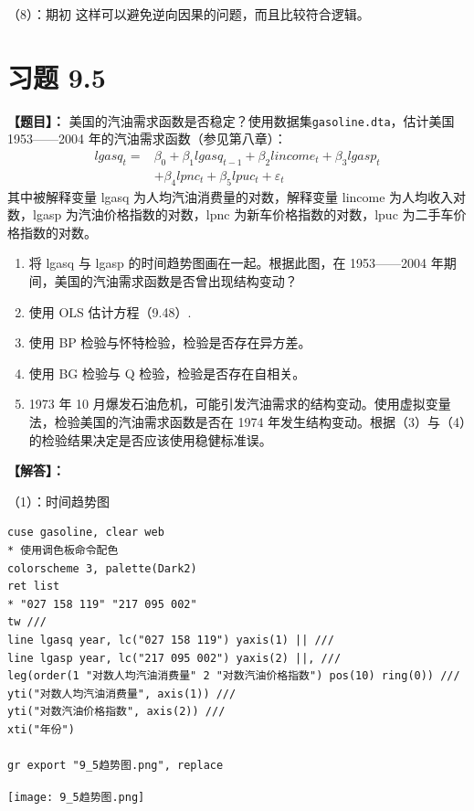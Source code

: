 \documentclass[cn,fancy,blue,11pt]{elegantbook}
\begin{document}
（8）：期初
这样可以避免逆向因果的问题，而且比较符合逻辑。

\hypertarget{section-49}{%
\section{习题 9.5}\label{section-49}}

\textbf{【题目】：}
美国的汽油需求函数是否稳定？使用数据集\lstinline{gasoline.dta}，估计美国 1953------2004 年的汽油需求函数（参见第八章）：
\begin{align}
lgasq_t =& \beta_0 + \beta_1 lgasq_{t-1} + \beta_2lincome_t + \beta_3lgasp_t \\
& + \beta_4lpnc_t + \beta_5lpuc_t + \varepsilon_t
\end{align}
其中被解释变量 lgasq 为人均汽油消费量的对数，解释变量 lincome 为人均收入对数，lgasp 为汽油价格指数的对数，lpnc 为新车价格指数的对数，lpuc 为二手车价格指数的对数。

\begin{enumerate}
\item
  将 lgasq 与 lgasp 的时间趋势图画在一起。根据此图，在 1953------2004 年期间，美国的汽油需求函数是否曾出现结构变动？
\item
  使用 OLS 估计方程（9.48）.
\item
  使用 BP 检验与怀特检验，检验是否存在异方差。
\item
  使用 BG 检验与 Q 检验，检验是否存在自相关。
\item
  1973 年 10 月爆发石油危机，可能引发汽油需求的结构变动。使用虚拟变量法，检验美国的汽油需求函数是否在 1974 年发生结构变动。根据（3）与（4）的检验结果决定是否应该使用稳健标准误。
\end{enumerate}

\textbf{【解答】：}

（1）：时间趋势图

\begin{lstlisting}
cuse gasoline, clear web
* 使用调色板命令配色
colorscheme 3, palette(Dark2)
ret list
* "027 158 119" "217 095 002"
tw ///
line lgasq year, lc("027 158 119") yaxis(1) || ///
line lgasp year, lc("217 095 002") yaxis(2) ||, ///
leg(order(1 "对数人均汽油消费量" 2 "对数汽油价格指数") pos(10) ring(0)) ///
yti("对数人均汽油消费量", axis(1)) ///
yti("对数汽油价格指数", axis(2)) ///
xti("年份")

gr export "9_5趋势图.png", replace
\end{lstlisting}

\noindent\texttt{[image: 9\_5趋势图.png]}
\end{document}
